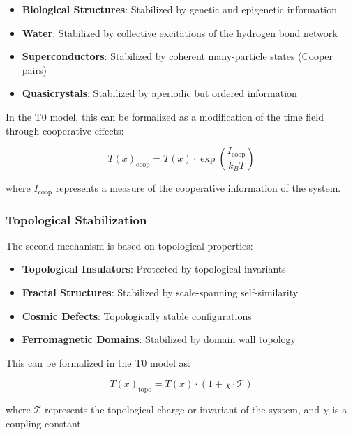 \documentclass[12pt,a4paper]{article}
\newcommand{\Tfield}{T(x)}
\begin{document}
	\begin{itemize}
		\item \textbf{Biological Structures}: Stabilized by genetic and epigenetic information
		\item \textbf{Water}: Stabilized by collective excitations of the hydrogen bond network
		\item \textbf{Superconductors}: Stabilized by coherent many-particle states (Cooper pairs)
		\item \textbf{Quasicrystals}: Stabilized by aperiodic but ordered information
	\end{itemize}
	
	In the T0 model, this can be formalized as a modification of the time field through cooperative effects:
	
	\begin{equation}
		\Tfield_{\text{coop}} = \Tfield \cdot \exp\left(\frac{I_{\text{coop}}}{k_B T}\right)
	\end{equation}
	
	where $I_{\text{coop}}$ represents a measure of the cooperative information of the system.
	
	\subsubsection{Topological Stabilization}
	
	The second mechanism is based on topological properties:
	
	\begin{itemize}
		\item \textbf{Topological Insulators}: Protected by topological invariants
		\item \textbf{Fractal Structures}: Stabilized by scale-spanning self-similarity
		\item \textbf{Cosmic Defects}: Topologically stable configurations
		\item \textbf{Ferromagnetic Domains}: Stabilized by domain wall topology
	\end{itemize}
	
	This can be formalized in the T0 model as:
	
	\begin{equation}
		\Tfield_{\text{topo}} = \Tfield \cdot (1 + \chi \cdot \mathcal{T})
	\end{equation}
	
	where $\mathcal{T}$ represents the topological charge or invariant of the system, and $\chi$ is a coupling constant.
	
\end{document}
